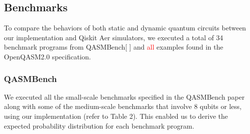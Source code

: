 \documentclass[10pt,a4paper]{article}
\newcommand{\<}{\langle}
\renewcommand{\>}{\rangle}
\newcommand{\red}[1]{\textcolor{red}{#1}}
\begin{document}
\subsection{Benchmarks}

To compare the behaviors of both static and dynamic quantum circuits between our implementation and
Qiskit Aer simulators, we executed a total of 34 benchmark programs from QASMBench[ ] and \red{all} examples
found in the OpenQASM2.0 specification.

\subsubsection{QASMBench}

We executed all the small-scale benchmarks specified in the QASMBench paper along with some of the
medium-scale benchmarks that involve 8 qubits or less, using our implementation (refer to Table 2).
This enabled us to derive the expected probability distribution for each benchmark program.
\end{document}
